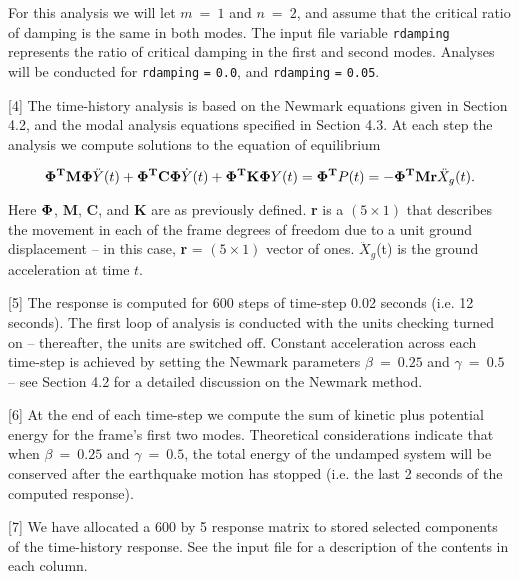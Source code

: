 \begin{description}
For this analysis we will let $m ~=~ 1$ and $n ~=~ 2$,
and assume that the critical ratio of damping is the same in both modes.
The input file variable {\tt rdamping} represents the ratio
of critical damping in the first and second modes. Analyses will
be conducted for {\tt rdamping} {\tt =} {\tt 0.0},
and {\tt rdamping} {\tt =} {\tt 0.05}.

\item{[4]}
The time-history analysis is based on the Newmark equations
given in Section 4.2, and the modal analysis equations specified
in Section 4.3. At each step the analysis we compute
solutions to the equation of equilibrium

\begin{equation}
{\bf \Phi^T} {\bf M} {\bf \Phi} {\ddot Y}(t) +
{\bf \Phi^T} {\bf C} {\bf \Phi} {\dot Y}(t) +
{\bf \Phi^T} {\bf K} {\bf \Phi} {Y}(t) =
{\bf \Phi^T} {P}(t) = - {\bf \Phi^T} {\bf M} {\bf r} {\ddot X_g}(t).
\label{eq: damping-part3}
\end{equation}

Here ${\bf \Phi}$, {\bf M}, {\bf C}, and {\bf K} are as previously defined.
{\bf r} is a $(5 \times 1)$ that describes the movement in each of the
frame degrees of freedom due to a unit ground displacement -- in this
case, {\bf r} = $(5 \times 1)$ vector of ones.
${\ddot X_g}$(t) is the ground acceleration at time $t$.

\item{[5]}
The response is computed for 600 steps of time-step 0.02 seconds (i.e. 12 seconds).
The first loop of analysis is conducted with the units
checking turned on -- thereafter, the units are switched off.
Constant acceleration across each time-step is achieved by
setting the Newmark parameters $\beta ~=~ 0.25$ and $\gamma ~=~ 0.5$ --
see Section 4.2 for a detailed discussion on the Newmark method.

\item{[6]}
At the end of each time-step we compute the sum of kinetic
plus potential energy for the frame's first two modes. Theoretical
considerations indicate that when $\beta ~=~ 0.25$ and $\gamma ~=~ 0.5$,
the total energy of the undamped system will be conserved after the
earthquake motion has stopped (i.e. the last 2 seconds of the computed response).

\item{[7]}
We have allocated a 600 by 5 response matrix to stored selected components
of the time-history response. See the input file for a description
of the contents in each column.

\end{description}


